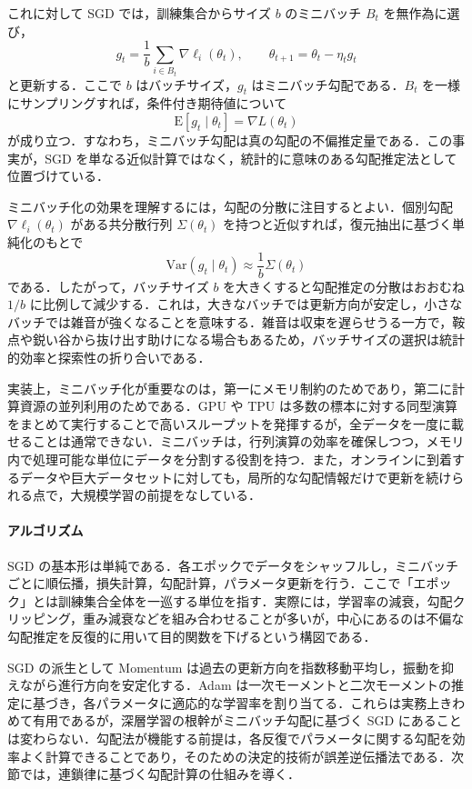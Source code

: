これに対して SGD では，訓練集合からサイズ $b$ のミニバッチ $B_t$ を無作為に選び，
\begin{equation}
g_t
= \frac{1}{b}\sum_{i\in B_t}\nabla \ell_i(\theta_t),
\qquad
\theta_{t+1}=\theta_t-\eta_t g_t
\end{equation}
と更新する．ここで $b$ はバッチサイズ，$g_t$ はミニバッチ勾配である．$B_t$ を一様にサンプリングすれば，条件付き期待値について
\begin{equation}
\mathrm{E}[g_t\mid \theta_t] = \nabla L(\theta_t)
\end{equation}
が成り立つ．すなわち，ミニバッチ勾配は真の勾配の不偏推定量である．この事実が，SGD を単なる近似計算ではなく，統計的に意味のある勾配推定法として位置づけている．

ミニバッチ化の効果を理解するには，勾配の分散に注目するとよい．個別勾配 $\nabla \ell_i(\theta_t)$ がある共分散行列 $\Sigma(\theta_t)$ を持つと近似すれば，復元抽出に基づく単純化のもとで
\begin{equation}
\mathrm{Var}(g_t\mid \theta_t)\approx \frac{1}{b}\Sigma(\theta_t)
\end{equation}
である．したがって，バッチサイズ $b$ を大きくすると勾配推定の分散はおおむね $1/b$ に比例して減少する．これは，大きなバッチでは更新方向が安定し，小さなバッチでは雑音が強くなることを意味する．雑音は収束を遅らせうる一方で，鞍点や鋭い谷から抜け出す助けになる場合もあるため，バッチサイズの選択は統計的効率と探索性の折り合いである．

実装上，ミニバッチ化が重要なのは，第一にメモリ制約のためであり，第二に計算資源の並列利用のためである．GPU や TPU は多数の標本に対する同型演算をまとめて実行することで高いスループットを発揮するが，全データを一度に載せることは通常できない．ミニバッチは，行列演算の効率を確保しつつ，メモリ内で処理可能な単位にデータを分割する役割を持つ．また，オンラインに到着するデータや巨大データセットに対しても，局所的な勾配情報だけで更新を続けられる点で，大規模学習の前提をなしている．

\paragraph*{アルゴリズム}
SGD の基本形は単純である．各エポックでデータをシャッフルし，ミニバッチごとに順伝播，損失計算，勾配計算，パラメータ更新を行う．ここで「エポック」とは訓練集合全体を一巡する単位を指す．実際には，学習率の減衰，勾配クリッピング，重み減衰などを組み合わせることが多いが，中心にあるのは不偏な勾配推定を反復的に用いて目的関数を下げるという構図である．

SGD の派生として Momentum は過去の更新方向を指数移動平均し，振動を抑えながら進行方向を安定化する．Adam は一次モーメントと二次モーメントの推定に基づき，各パラメータに適応的な学習率を割り当てる．これらは実務上きわめて有用であるが，深層学習の根幹がミニバッチ勾配に基づく SGD にあることは変わらない．勾配法が機能する前提は，各反復でパラメータに関する勾配を効率よく計算できることであり，そのための決定的技術が誤差逆伝播法である．次節では，連鎖律に基づく勾配計算の仕組みを導く．


